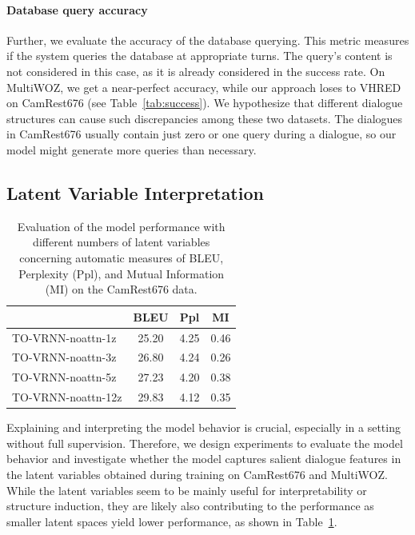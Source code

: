 \paragraph{Database query accuracy}
Further, we evaluate the accuracy of the database querying.
This metric measures if the system queries the database at appropriate turns.
The query's content is not considered in this case, as it is already considered in the success rate.
On MultiWOZ, we get a near-perfect accuracy, while our approach loses to VHRED on CamRest676 (see Table~\ref{tab:success}).
We hypothesize that different dialogue structures can cause such discrepancies among these two datasets.
The dialogues in CamRest676 usually contain just zero or one query during a dialogue, so our model might generate more queries than necessary.

\subsection{Latent Variable Interpretation}

\label{05:sec:latents}
\begin{table}[tp]
    \centering\small
    \begin{tabular}{l|ccc}
      \toprule
      & BLEU & Ppl & MI  \\
    \midrule
    TO-VRNN-noattn-1z  & 25.20 & 4.25 & 0.46  \\
    TO-VRNN-noattn-3z  & 26.80 & 4.24 & 0.26  \\
    TO-VRNN-noattn-5z  & 27.23 & 4.20 & 0.38  \\
    TO-VRNN-noattn-12z  & 29.83 & 4.12 & 0.35  \\    

    \bottomrule
  \end{tabular}
  \caption{Evaluation of the model performance with different numbers of latent variables concerning automatic measures of BLEU, Perplexity (Ppl), and Mutual Information (MI) on the CamRest676 data.}
  \label{05:z_counts}
\end{table}
Explaining and interpreting the model behavior is crucial, especially in a setting without full supervision.
Therefore, we design experiments to evaluate the model behavior and investigate whether the model captures salient dialogue features in the latent variables obtained during training on CamRest676 and MultiWOZ.
While the latent variables seem to be mainly useful for interpretability or structure induction, they are likely also contributing to the performance as smaller latent spaces yield lower performance, as shown in Table~\ref{05:z_counts}.

